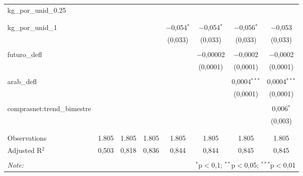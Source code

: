 \begin{table}[!htbp]
\begin{tabular}{@{\extracolsep{5pt}}lccccccc}
 kg\_por\_unid\_0.25 &  &  &  &  &  &  &  \\ 
  &  &  &  &  &  &  &  \\ 
  & & & & & & & \\ 
 kg\_por\_unid\_1 &  &  &  & $-$0,054$^{*}$ & $-$0,054$^{*}$ & $-$0,056$^{*}$ & $-$0,053 \\ 
  &  &  &  & (0,033) & (0,033) & (0,033) & (0,033) \\ 
  & & & & & & & \\ 
 futuro\_defl &  &  &  &  & $-$0,00002 & $-$0,0002 & $-$0,0002 \\ 
  &  &  &  &  & (0,0001) & (0,0001) & (0,0001) \\ 
  & & & & & & & \\ 
 arab\_defl &  &  &  &  &  & 0,0004$^{***}$ & 0,0004$^{***}$ \\ 
  &  &  &  &  &  & (0,0001) & (0,0001) \\ 
  & & & & & & & \\ 
 comprasnet:trend\_bimestre &  &  &  &  &  &  & 0,006$^{*}$ \\ 
  &  &  &  &  &  &  & (0,003) \\ 
  & & & & & & & \\ 
\hline \\[-1.8ex] 
Observations & 1.805 & 1.805 & 1.805 & 1.805 & 1.805 & 1.805 & 1.805 \\ 
Adjusted R$^{2}$ & 0,503 & 0,818 & 0,836 & 0,844 & 0,844 & 0,845 & 0,845 \\ 
\hline 
\hline \\[-1.8ex] 
\textit{Note:}  & \multicolumn{7}{r}{$^{*}$p$<$0,1; $^{**}$p$<$0,05; $^{***}$p$<$0,01} \\ 
\end{tabular} 
\end{table} 
